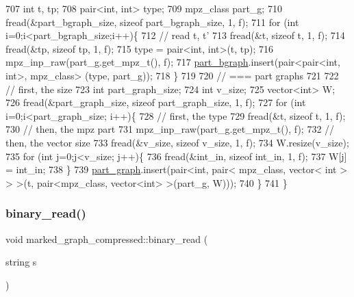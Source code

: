 \begin{DoxyCode}
707   \textcolor{keywordtype}{int} t, tp;
708   pair<int, int> type; 
709   mpz\_class part\_g; 
710   fread(&part\_bgraph\_size, \textcolor{keyword}{sizeof} part\_bgraph\_size, 1, f);
711   \textcolor{keywordflow}{for} (\textcolor{keywordtype}{int} i=0;i<part\_bgraph\_size;i++)\{
712     \textcolor{comment}{// read t, t'}
713     fread(&t, \textcolor{keyword}{sizeof} t, 1, f);
714     fread(&tp, \textcolor{keyword}{sizeof} tp, 1, f);
715     type = pair<int, int>(t, tp);
716     mpz\_inp\_raw(part\_g.get\_mpz\_t(), f);
717     \hyperlink{classmarked__graph__compressed_a7b3267063fba30b45eb21b3ba4e07536}{part\_bgraph}.insert(pair<pair<int, int>, mpz\_class> (type, part\_g));
718   \}
719 
720   \textcolor{comment}{// === part graphs}
721 
722   \textcolor{comment}{// first, the size}
723   \textcolor{keywordtype}{int} part\_graph\_size;
724   \textcolor{keywordtype}{int} v\_size;
725   vector<int> W; 
726   fread(&part\_graph\_size, \textcolor{keyword}{sizeof} part\_graph\_size, 1, f);
727   \textcolor{keywordflow}{for} (\textcolor{keywordtype}{int} i=0;i<part\_graph\_size; i++)\{
728     \textcolor{comment}{// first, the type}
729     fread(&t, \textcolor{keyword}{sizeof} t, 1, f);
730     \textcolor{comment}{// then, the mpz part}
731     mpz\_inp\_raw(part\_g.get\_mpz\_t(), f);
732     \textcolor{comment}{// then, the vector size}
733     fread(&v\_size, \textcolor{keyword}{sizeof} v\_size, 1, f);
734     W.resize(v\_size);
735     \textcolor{keywordflow}{for} (\textcolor{keywordtype}{int} j=0;j<v\_size; j++)\{
736       fread(&int\_in, \textcolor{keyword}{sizeof} int\_in, 1, f);
737       W[j] = int\_in;
738     \}
739     \hyperlink{classmarked__graph__compressed_ae179a4737e6eab905c18a94d44ef64b7}{part\_graph}.insert(pair<\textcolor{keywordtype}{int}, pair< mpz\_class, vector< int > > >(t, pair<mpz\_class, vector<int>
       >(part\_g, W)));
740   \}
741 \}
\end{DoxyCode}
\mbox{\label{classmarked__graph__compressed_a01c67fe4234738db6bb60459515c3ad8}} 
\subsubsection{\texorpdfstring{binary\+\_\+read()}{binary\_read()}\hspace{0.1cm}{\footnotesize\ttfamily [2/2]}}
{\footnotesize\ttfamily void marked\+\_\+graph\+\_\+compressed\+::binary\+\_\+read (\begin{DoxyParamCaption}\item[{string}]{s }\end{DoxyParamCaption})}

